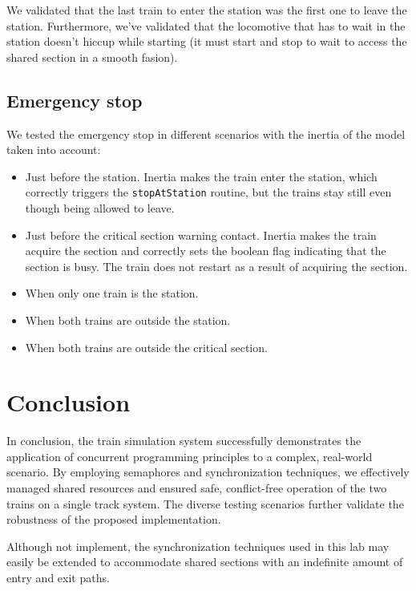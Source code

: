 \documentclass{article}
\begin{document}
    We validated that the last train to enter the station was the first one to leave the station. Furthermore, we've validated that the locomotive that has to wait in the station doesn't hiccup while starting (it must start and stop to wait to access the shared section in a smooth fasion).

    \subsection*{Emergency stop}

    We tested the emergency stop in different scenarios with the inertia of the model taken into account:
    \begin{itemize}
        \item Just before the station. Inertia makes the train enter the station, which correctly triggers the \texttt{stopAtStation} routine, but the trains stay still even though being allowed to leave.
        \item Just before the critical section warning contact. Inertia makes the train acquire the section and correctly sets the boolean flag indicating that the section is busy. The train does not restart as a result of acquiring the section.
        \item When only one train is the station.
        \item When both trains are outside the station.
        \item When both trains are outside the critical section.
    \end{itemize}


    \section{Conclusion}

    In conclusion, the train simulation system successfully demonstrates the application of concurrent programming principles to a complex, real-world scenario. By employing semaphores and synchronization techniques, we effectively managed shared resources and ensured safe, conflict-free operation of the two trains on a single track system. The diverse testing scenarios further validate the robustness of the proposed implementation.

    Although not implement, the synchronization techniques used in this lab may easily be extended to accommodate shared sections with an indefinite amount of entry and exit paths.

    \appendix
\end{document}

